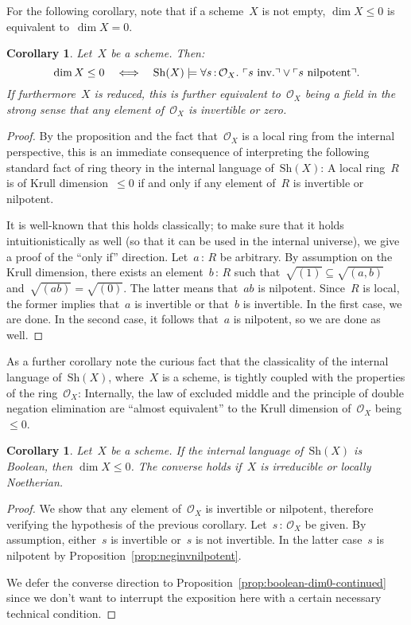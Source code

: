 \documentclass[10pt]{amsart}
\makeatletter
\theoremstyle{definition}
\theoremstyle{plain}
\newtheorem{cor}[defn]{Corollary}
\theoremstyle{remark}
\renewcommand{\O}{\mathcal{O}}
\newcommand{\Sh}{\mathrm{Sh}}
\newcommand{\?}{\,{:}\,}
\renewcommand{\_}{\mathpunct{.}\,}
\newcommand{\speak}[1]{\ulcorner\text{\textnormal{#1}}\urcorner}
\newcommand{\inv}{inv.\@}
\makeatother
\begin{document}
For the following corollary, note that if a scheme~$X$ is not empty, $\dim X
\leq 0$ is equivalent to~$\dim X = 0$.
\begin{cor}\label{cor:scheme-dimension-zero}
Let~$X$ be a scheme. Then:
\[ \dim X \leq 0 \quad\Longleftrightarrow\quad
  \Sh(X) \models \forall s\?\O_X\_ \speak{$s$ \inv} \vee \speak{$s$ nilpotent}.
  \]
If furthermore~$X$ is reduced, this is further equivalent to~$\O_X$ being a
field in the strong sense that any element of~$\O_X$ is invertible or zero.
\end{cor}
\begin{proof}By the proposition and the fact that~$\O_X$ is a local ring from
the internal perspective, this is an immediate consequence of
interpreting the following standard fact of ring theory in the internal
language of~$\Sh(X)$: A local ring~$R$ is of Krull
dimension~$\leq 0$ if and only if any element of~$R$ is invertible or
nilpotent.

It is well-known that this holds classically; to make sure that it
holds intuitionistically as well (so that it can be used in the internal
universe), we give a proof of the ``only if'' direction. Let~$a \? R$ be
arbitrary. By assumption on the Krull dimension, there exists an element~$b \?
R$ such that~$\sqrt{(1)} \subseteq \sqrt{(a,b)}$ and~$\sqrt{(ab)} =
\sqrt{(0)}$. The latter means that~$ab$ is nilpotent. Since~$R$ is local, the
former implies that~$a$ is invertible or that~$b$ is invertible. In the first
case, we are done. In the second case, it follows that~$a$ is nilpotent, so we
are done as well.
\end{proof}

As a further corollary note the curious fact that the classicality of the
internal language of~$\Sh(X)$, where~$X$ is a scheme, is tightly coupled with
the properties of the ring~$\O_X$: Internally, the law of excluded middle and
the principle of double negation elimination are ``almost equivalent'' to the
Krull dimension of~$\O_X$ being~$\leq 0$.
\begin{cor}\label{cor:boolean-dim0}
Let~$X$ be a scheme. If the internal language of~$\Sh(X)$ is Boolean, then
$\dim X \leq 0$. The converse holds if~$X$ is irreducible or locally Noetherian.
\end{cor}
\begin{proof}
We show that any element of~$\O_X$ is invertible or nilpotent, therefore
verifying the hypothesis of the previous corollary.
Let~$s\?\O_X$ be given. By assumption, either~$s$ is invertible or~$s$ is not
invertible. In the latter case~$s$ is nilpotent by
Proposition~\ref{prop:neginvnilpotent}.

We defer the converse direction to
Proposition~\ref{prop:boolean-dim0-continued} since we don't want to interrupt
the exposition here with a certain necessary technical condition.
\end{proof}
\end{document}
